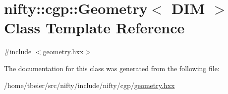 \hypertarget{classnifty_1_1cgp_1_1Geometry}{}\section{nifty\+:\+:cgp\+:\+:Geometry$<$ D\+IM $>$ Class Template Reference}
\label{classnifty_1_1cgp_1_1Geometry}


{\ttfamily \#include $<$geometry.\+hxx$>$}



The documentation for this class was generated from the following file\+:\begin{DoxyCompactItemize}
\item 
/home/tbeier/src/nifty/include/nifty/cgp/\hyperlink{geometry_8hxx}{geometry.\+hxx}\end{DoxyCompactItemize}
